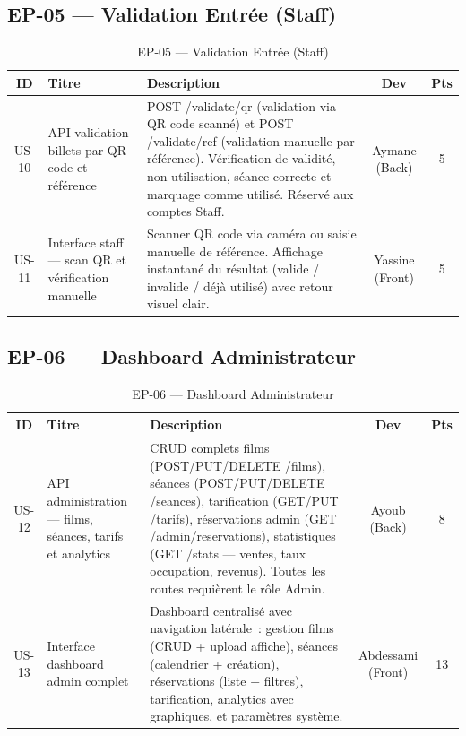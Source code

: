 \documentclass[12pt]{report}
\begin{document}
\subsection*{EP-05 — Validation Entrée (Staff)}
 
\begin{table}[H]
\centering
\renewcommand{\arraystretch}{1.45}
\begin{tabular}{|c|p{3.8cm}|p{6.2cm}|c|c|}
\hline
\rowcolor{gray!20}
\textbf{ID} & \textbf{Titre} & \textbf{Description}
            & \textbf{Dev} & \textbf{Pts} \\
\hline
US-10 &
API validation billets par QR code et référence &
POST /validate/qr (validation via QR code scanné)
et POST /validate/ref (validation manuelle par référence).
Vérification de validité, non-utilisation, séance correcte
et marquage comme utilisé. Réservé aux comptes Staff. &
Aymane (Back) & 5 \\
\hline
US-11 &
Interface staff — scan QR et vérification manuelle &
Scanner QR code via caméra ou saisie manuelle de référence.
Affichage instantané du résultat (valide / invalide /
déjà utilisé) avec retour visuel clair. &
Yassine (Front) & 5 \\
\hline
\end{tabular}
\caption{EP-05 — Validation Entrée (Staff)}
\label{tab:ep05}
\end{table}
 
\subsection*{EP-06 — Dashboard Administrateur}
 
\begin{table}[H]
\centering
\renewcommand{\arraystretch}{1.45}
\begin{tabular}{|c|p{3.8cm}|p{6.2cm}|c|c|}
\hline
\rowcolor{gray!20}
\textbf{ID} & \textbf{Titre} & \textbf{Description}
            & \textbf{Dev} & \textbf{Pts} \\
\hline
US-12 &
API administration — films, séances, tarifs et analytics &
CRUD complets films (POST/PUT/DELETE /films),
séances (POST/PUT/DELETE /seances),
tarification (GET/PUT /tarifs),
réservations admin (GET /admin/reservations),
statistiques (GET /stats — ventes, taux occupation,
revenus). Toutes les routes requièrent le rôle Admin. &
Ayoub (Back) & 8 \\
\hline
US-13 &
Interface dashboard admin complet &
Dashboard centralisé avec navigation latérale~:
gestion films (CRUD + upload affiche), séances
(calendrier + création), réservations (liste + filtres),
tarification, analytics avec graphiques,
et paramètres système. &
Abdessami (Front) & 13 \\
\hline
\end{tabular}
\caption{EP-06 — Dashboard Administrateur}
\label{tab:ep06}
\end{table}
 
\end{document}
